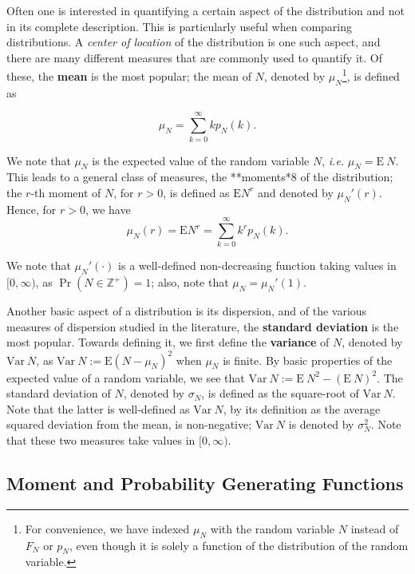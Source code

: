 \documentclass[]{book}
\let\rmarkdownfootnote\footnote%
\def\footnote{\protect\rmarkdownfootnote}
\theoremstyle{definition}
\theoremstyle{definition}
\theoremstyle{definition}
\theoremstyle{remark}
\begin{document}
Often one is interested in quantifying a certain aspect of the
distribution and not in its complete description. This is particularly
useful when comparing distributions. A \emph{center of location} of the
distribution is one such aspect, and there are many different measures
that are commonly used to quantify it. Of these, the \textbf{mean} is
the most popular; the mean of \(N\), denoted by \(\mu_N\)\footnote{For
  convenience, we have indexed \(\mu_N\) with the random variable \(N\)
  instead of \(F_N\) or \(p_N\), even though it is solely a function of
  the distribution of the random variable.}, is defined as

\begin{equation}
\mu_N=\sum_{k=0}^\infty kp_N(k).
\end{equation}

We note that \(\mu_N\) is the expected value of the random variable
\(N\), \emph{i.e.} \(\mu_N=\mathrm{E}~N\). This leads to a general class
of measures, the **moments*8 of the distribution; the \(r\)-th moment of
\(N\), for \(r> 0\), is defined as \(\mathrm{E}{N^r}\) and denoted by
\(\mu_N'(r)\). Hence, for \(r>0\), we have\\

\begin{equation}
\mu_N(r)= \mathrm{E}{N^r}= \sum_{k=0}^\infty k^r p_N(k).
\end{equation}

We note that \(\mu_N'(\cdot)\) is a well-defined non-decreasing function
taking values in \([0,\infty)\), as \(\Pr(N\in\mathbb{Z}^+)=1\); also,
note that \(\mu_N=\mu_N'(1)\).

Another basic aspect of a distribution is its dispersion, and of the
various measures of dispersion studied in the literature, the
\textbf{standard deviation} is the most popular. Towards defining it, we
first define the \textbf{variance} of \(N\), denoted by
\(\mathrm{Var}~N\), as \(\mathrm{Var}~N:=\mathrm{E}{(N-\mu_N)^2}\) when
\(\mu_N\) is finite. By basic properties of the expected value of a
random variable, we see that
\(\mathrm{Var}~N:=\mathrm{E}~{N^2}-(\mathrm{E}~N)^2\). The standard
deviation of \(N\), denoted by \(\sigma_N\), is defined as the
square-root of \(\mathrm{Var}~N\). Note that the latter is well-defined
as \(\mathrm{Var}~N\), by its definition as the average squared
deviation from the mean, is non-negative; \(\mathrm{Var}~N\) is denoted
by \(\sigma_N^2\). Note that these two measures take values in
\([0,\infty)\).

\subsection{Moment and Probability Generating
Functions}\label{S:generating-functions}
\end{document}
